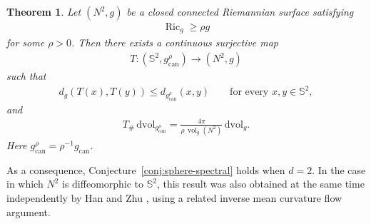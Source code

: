 \documentclass[11pt,reqno]{amsart}
\numberwithin{equation}{section}
\newtheorem{thm}{Theorem}[section]
\theoremstyle{definition}
\theoremstyle{remark}
\def\bS {\mathbb{S}}
\newcommand{\0}{\emptyset}
\newcommand{\Ric}{\operatorname{Ric}}
\newcommand{\can}{\mathrm{can}}
\newcommand{\vol}{\operatorname{vol}}
\newcommand{\dvol}{\,\mathrm{dvol}}
\begin{document}
\begin{thm}\label{thm:sphere-transport-dimension-two}
Let $(N^2,g)$ be a closed connected Riemannian surface satisfying
\begin{align}\label{eq:sphere-transport-dimension-two-Ricci}
        \Ric_g
        \geq
        \rho g
\end{align}
for some $\rho>0$. Then there exists a continuous surjective map
\begin{align}
        T:
        (\bS^2,g^\rho_{\can})
        \to
        (N^2,g)
\end{align}
such that
\begin{align}\label{eq:sphere-transport-dimension-two-contraction}
        d_g(T(x),T(y))
        \leq
        d_{g^\rho_{\can}}(x,y)
        \qquad
        \text{for every }x,y\in\bS^2,
\end{align}
and
\begin{align}\label{eq:sphere-transport-dimension-two-pushforward}
        T_\#\dvol_{g^\rho_{\can}}
        =
        \frac{4\pi}{\rho\,\vol_g(N^2)}
        \dvol_g.
\end{align}
Here $g^\rho_{\can}=\rho^{-1}g_{\can}$.
\end{thm}
As a consequence, Conjecture~\ref{conj:sphere-spectral} holds when $d=2$. In the case in which $N^2$ is diffeomorphic to $\bS^2$, this result was also obtained at the same time independently by Han and Zhu \cite{han-zhu}, using a related inverse mean curvature flow argument.
\end{document}
